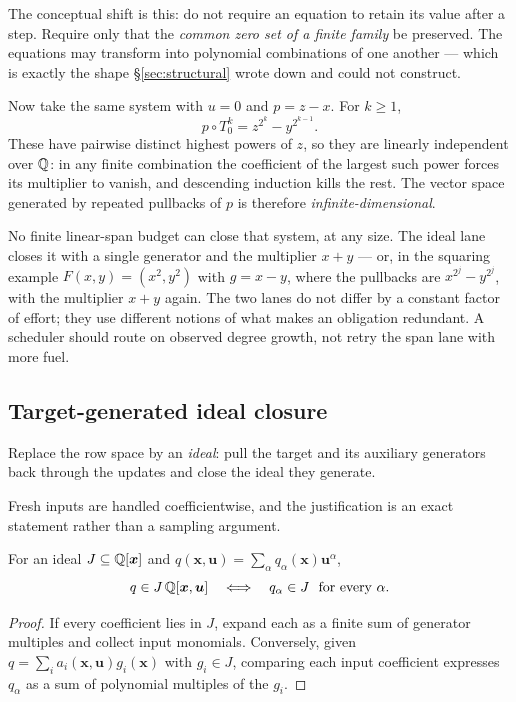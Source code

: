 The conceptual shift is this: do not require an equation to retain its value
after a step. Require only that the \emph{common zero set of a finite family}
be preserved. The equations may transform into polynomial combinations of one
another --- which is exactly the shape \S\ref{sec:structural} wrote down and
could not construct.

Now take the same system with $u=0$ and $p=z-x$. For $k\ge1$,
\[
 p\circ T_0^{k}=z^{2^{k}}-y^{2^{k-1}} .
\]
These have pairwise distinct highest powers of $z$, so they are linearly
independent over $\mathbb{Q}$: in any finite combination the coefficient of the largest
such power forces its multiplier to vanish, and descending induction kills the
rest. The vector space generated by repeated pullbacks of $p$ is therefore
\emph{infinite-dimensional}.

\begin{remark}
No finite linear-span budget can close that system, at any size. The ideal lane
closes it with a single generator and the multiplier $x+y$ --- or, in the
squaring example $F(x,y)=(x^2,y^2)$ with $g=x-y$, where the pullbacks are
$x^{2^j}-y^{2^j}$, with the multiplier $x+y$ again. The two lanes do not differ
by a constant factor of effort; they use different notions of what makes an
obligation redundant. A scheduler should route on observed degree growth, not
retry the span lane with more fuel.
\end{remark}

\subsection{Target-generated ideal closure}
\label{sec:ideal-closure}

Replace the row space by an \emph{ideal}: pull the target and its auxiliary
generators back through the updates and close the ideal they generate.

Fresh inputs are handled coefficientwise, and the justification is an exact
statement rather than a sampling argument.

\begin{lemma}
\label{lem:fresh}
For an ideal $J\subseteq\mathbb{Q}[\bm x]$ and
$q(\bm x,\bm u)=\sum_\alpha q_\alpha(\bm x)\bm u^\alpha$,
\[
 q\in J\,\mathbb{Q}[\bm x,\bm u]
 \quad\Longleftrightarrow\quad
 q_\alpha\in J\ \text{ for every }\alpha .
\]
\end{lemma}
\begin{proof}
If every coefficient lies in $J$, expand each as a finite sum of generator
multiples and collect input monomials. Conversely, given
$q=\sum_i a_i(\bm x,\bm u)g_i(\bm x)$ with $g_i\in J$, comparing each input
coefficient expresses $q_\alpha$ as a sum of polynomial multiples of the $g_i$.
\end{proof}

